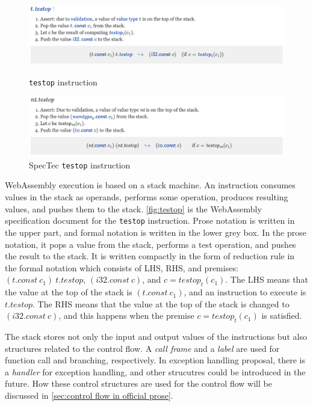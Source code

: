 \begin{figure}[t]
    \centerline{\includegraphics[width=15cm]{fig/testop}}
    \caption[Enter the caption title here]{\texttt{testop} instruction} \label{fig:testop}
    \centerline{\includegraphics[width=15cm]{fig/spectec-testop}}
    \caption[Enter the caption title here]{SpecTec \texttt{testop} instruction} \label{fig:spectec-testop}
\end{figure}


WebAssembly execution is based on a stack machine.
An instruction consumes values in the stack as operands, performs some
operation, produces resulting values, and pushes them to the stack.
\cref{fig:testop} is the WebAssembly specification document for the
\texttt{testop} instruction.
Prose notation is written in the upper part, and formal notation is written in
the lower grey box.
In the prose notation, it pops a value from the stack, performs a test
operation, and pushes the result to the stack.
It is written compactly in the form of reduction rule in the formal notation
which consists of LHS, RHS, and premises: $(t.const ~ c_1) ~ t.testop$,
$(i32.const ~ c)$, and $c = testop_t(c_1)$.
The LHS means that the value at the top of the stack is $(t.const ~ c_1)$,
and an instruction to execute is $t.testop$.
The RHS means that the value at the top of the stack is changed to $(i32.const
~ c)$, and this happens when the premise $c = testop_t(c_1)$ is satisfied.


The stack stores not only the input and output values of the instructions but also
structures related to the control flow.
A \textit{call frame} and a \textit{label} are used for function call and
branching, respectively.
In exception handling proposal, there is a \textit{handler} for exception
handling, and other strucutres could be introduced in the future.
How these control structures are used for the control flow will be discussed in
\cref{sec:control flow in official prose}.



